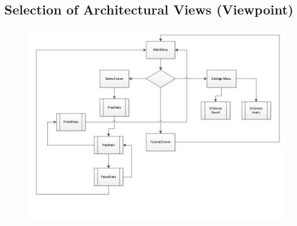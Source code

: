 \subsection{Selection of Architectural Views (Viewpoint)}

\begin{figure}[ht!]
	\centering
	\includegraphics[width=150mm]{viewpoint.jpg}
	\label{fig:viewpoint}
\end{figure}
